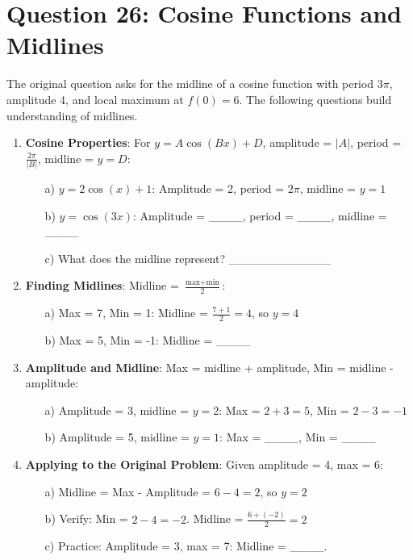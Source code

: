 \documentclass[12pt]{article}
\begin{document}
\section*{Question 26: Cosine Functions and Midlines}
The original question asks for the midline of a cosine function with period \( 3\pi \), amplitude 4, and local maximum at \( f(0) = 6 \). The following questions build understanding of midlines.

\begin{enumerate}[label=26.\arabic*]
    \item \textbf{Cosine Properties}: For \( y = A\cos(Bx) + D \), amplitude = \( |A| \), period = \( \frac{2\pi}{|B|} \), midline = \( y = D \):
    \begin{enumerate}
        \item[a)] \( y = 2\cos(x) + 1 \): Amplitude = 2, period = \( 2\pi \), midline = \( y = 1 \)
        \item[b)] \( y = \cos(3x) \): Amplitude = \_\_\_\_, period = \_\_\_\_, midline = \_\_\_\_
        \item[c)] What does the midline represent? \_\_\_\_\_\_\_\_\_\_\_\_
    \end{enumerate}
    \item \textbf{Finding Midlines}: Midline = \( \frac{\text{max} + \text{min}}{2} \):
    \begin{enumerate}
        \item[a)] Max = 7, Min = 1: Midline = \( \frac{7 + 1}{2} = 4 \), so \( y = 4 \)
        \item[b)] Max = 5, Min = -1: Midline = \_\_\_\_
    \end{enumerate}
    \item \textbf{Amplitude and Midline}: Max = midline + amplitude, Min = midline - amplitude:
    \begin{enumerate}
        \item[a)] Amplitude = 3, midline = \( y = 2 \): Max = \( 2 + 3 = 5 \), Min = \( 2 - 3 = -1 \)
        \item[b)] Amplitude = 5, midline = \( y = 1 \): Max = \_\_\_\_, Min = \_\_\_\_
    \end{enumerate}
    \item \textbf{Applying to the Original Problem}: Given amplitude = 4, max = 6:
    \begin{enumerate}
        \item[a)] Midline = Max - Amplitude = \( 6 - 4 = 2 \), so \( y = 2 \)
        \item[b)] Verify: Min = \( 2 - 4 = -2 \). Midline = \( \frac{6 + (-2)}{2} = 2 \)
        \item[c)] Practice: Amplitude = 3, max = 7: Midline = \_\_\_\_.
    \end{enumerate}
\end{enumerate}
\end{document}
